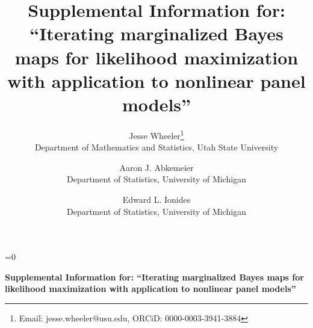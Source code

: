 \documentclass[12pt]{article}\usepackage[]{graphicx}\usepackage[]{xcolor}
\renewcommand{\blind}{1} %
\newcommand{\supptitle}{Supplemental Information for: ``Iterating marginalized Bayes maps for likelihood maximization with application to nonlinear panel models''}
\begin{document}
\ifnum\blind=0
  \title{\bf \supptitle} 
  \author{
    Jesse Wheeler\thanks{Email: jesse.wheeler@usu.edu, ORCiD: 0000-0003-3941-3884} \\
    Department of Mathematics and Statistics, Utah State University
    \and
    Aaron J. Abkemeier \\
    Department of Statistics, University of Michigan
    \and
    Edward L. Ionides \\
    Department of Statistics, University of Michigan
  }
  \maketitle
\else
  \vspace*{1.5cm} 
  \begin{center}
    {\Large\bf \supptitle \par}
  \end{center}
\vspace{3.5cm}
\fi


\tableofcontents
\newpage

\listoffigures
\vspace{1cm}

\listoftables
\newpage

\def\spacingset#1{\renewcommand{\baselinestretch}%
{#1}\small\normalsize} \spacingset{1}





\spacingset{1.9}

\end{document}

